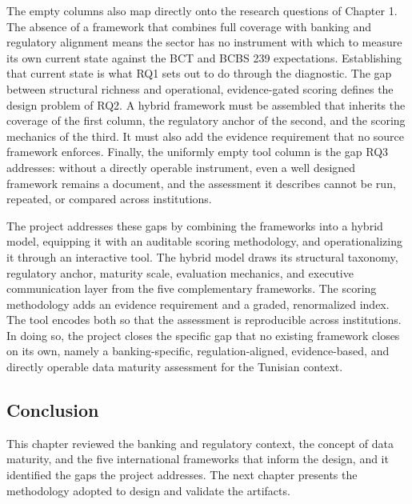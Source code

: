 The empty columns also map directly onto the research questions of Chapter 1. The absence of a framework that combines full coverage with banking and regulatory alignment means the sector has no instrument with which to measure its own current state against the BCT and BCBS 239 expectations. Establishing that current state is what RQ1 sets out to do through the diagnostic. The gap between structural richness and operational, evidence-gated scoring defines the design problem of RQ2. A hybrid framework must be assembled that inherits the coverage of the first column, the regulatory anchor of the second, and the scoring mechanics of the third. It must also add the evidence requirement that no source framework enforces. Finally, the uniformly empty tool column is the gap RQ3 addresses: without a directly operable instrument, even a well designed framework remains a document, and the assessment it describes cannot be run, repeated, or compared across institutions.

The project addresses these gaps by combining the frameworks into a hybrid model, equipping it with an auditable scoring methodology, and operationalizing it through an interactive tool. The hybrid model draws its structural taxonomy, regulatory anchor, maturity scale, evaluation mechanics, and executive communication layer from the five complementary frameworks. The scoring methodology adds an evidence requirement and a graded, renormalized index. The tool encodes both so that the assessment is reproducible across institutions. In doing so, the project closes the specific gap that no existing framework closes on its own, namely a banking-specific, regulation-aligned, evidence-based, and directly operable data maturity assessment for the Tunisian context.

\subsection{Conclusion}

This chapter reviewed the banking and regulatory context, the concept of data maturity, and the five international frameworks that inform the design, and it identified the gaps the project addresses. The next chapter presents the methodology adopted to design and validate the artifacts.
